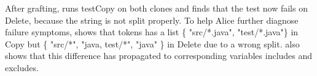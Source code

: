 After grafting, {\grafter} runs {\ttt testCopy} on both clones and finds that the test now fails on {\ttt Delete}, because the string is not split properly. To help Alice further diagnose failure symptoms, {\grafter} shows that {\ttt tokens} has a list \{ {\ttt "src/*.java"}, {\ttt "test/*.java"}\} in {\ttt Copy} but \{ {\ttt "src/*"}, {\ttt "java, test/*"}, {\ttt "java"} \} in {\ttt Delete} due to a wrong split. {\grafter} also shows that this difference has propagated to corresponding variables {\ttt includes} and {\ttt excludes}.